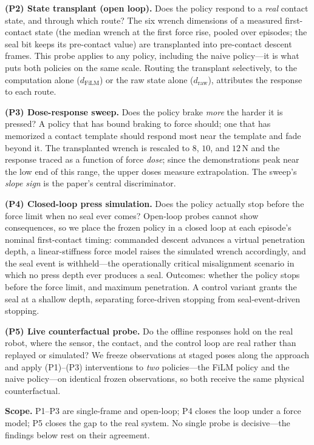 \textbf{(P2) State transplant (open loop).} Does the policy respond to a \emph{real}
contact state, and through which route? The six wrench dimensions of a measured first-contact
state (the median wrench at the first force rise, pooled over episodes; the seal bit keeps its
pre-contact value) are transplanted into pre-contact descent frames. This probe applies to any
policy, including the naive policy---it is what puts both policies on the same scale. Routing
the transplant selectively, to the \chat{} computation alone ($d_{\mathrm{FiLM}}$) or the raw
state alone ($d_{\mathrm{raw}}$), attributes the response to each route.

\textbf{(P3) Dose-response sweep.} Does the policy brake \emph{more} the harder it is
pressed? A policy that has bound braking to force should; one that has memorized a contact
template should respond most near the template and fade beyond it. The transplanted wrench is
rescaled to $8$, $10$, and $12$\,N and the response traced as a function of force \emph{dose};
since the demonstrations peak near the low end of this range, the upper doses measure
extrapolation. The sweep's \emph{slope sign} is the paper's central discriminator.

\textbf{(P4) Closed-loop press simulation.} Does the policy actually stop before the force
limit when no seal ever comes? Open-loop probes cannot show consequences, so we place the
frozen policy in a closed loop at each episode's nominal first-contact timing: commanded
descent advances a virtual penetration depth, a linear-stiffness force model raises the
simulated wrench accordingly, and the seal event is withheld---the operationally critical
misalignment scenario in which no press depth ever produces a seal. Outcomes: whether the
policy stops before the force limit, and maximum penetration. A control variant grants the seal
at a shallow depth, separating force-driven stopping from seal-event-driven stopping.

\textbf{(P5) Live counterfactual probe.} Do the offline responses hold on the real robot,
where the sensor, the contact, and the control loop are real rather than replayed or
simulated? We freeze observations at staged poses
along the approach and apply (P1)--(P3) interventions to \emph{two} policies---the FiLM
policy and the naive policy---on identical frozen observations, so both receive the same
physical counterfactual.

\textbf{Scope.} P1--P3 are single-frame and open-loop; P4 closes the loop under a force model;
P5 closes the gap to the real system. No single probe is decisive---the findings below rest on
their agreement.
